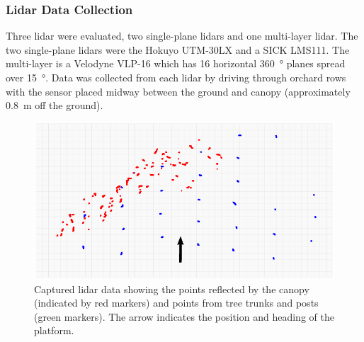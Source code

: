\documentclass[preprint,authoryear,12pt]{elsarticle}
\begin{document}
        


    \subsubsection{Lidar Data Collection}
        Three lidar were evaluated, two single-plane lidars and one multi-layer lidar.
        The two single-plane lidars were the Hokuyo UTM-30LX and a SICK LMS111.
        The multi-layer is a Velodyne VLP-16 which has 16 horizontal \SI{360}{\degree} planes spread over \SI{15}{\degree}.
    	Data was collected from each lidar by driving through orchard rows with the sensor placed midway between the ground and canopy (approximately \SI{0.8}{\meter} off the ground).

        \begin{figure}[htb]
            \centering
            \includegraphics[width=\linewidth]{imgs/canopy_data/canopy_data.pdf}
            \caption{
                Captured lidar data showing the points reflected by the canopy (indicated by red markers) and points from tree trunks and posts (green markers).
                The arrow indicates the position and heading of the platform.
            }
            \label{fig:canopyDataCloud}
        \end{figure}
\end{document}
